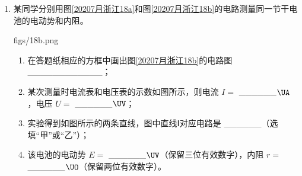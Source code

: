 \documentclass[\gkver]{gaokaozhenti}
\begin{document}
\begin{enumerate}
{（4）单摆的周期 $T=2\pi\sqrt{\frac{l}{g}}$，即 $T^{2}=\frac{4\pi^{2}}{g}\cdot l$。但是实验所得 $T^{2}-l$ 没过原点，测得重力加速度与当地结果相符，则斜率仍为 $\frac{4\pi^{2}}{g}$；则 $T^{2}=\frac{4\pi^{2}}{g}\cdot(l+l_{0})$，故实验可能是测量时直接将摆线的长度作为摆长了。
}

\item
某同学分别用图\ref{20207月浙江18a}和图\ref{20207月浙江18b}的电路测量同一节干电池的电动势和内阻。

{figs/18b.png}

\begin{enumerate}
	\item
	在答题纸相应的方框中画出图\ref{20207月浙江18b}的电路图 \_\_\_\_\_\_\_\_\_\_\_\_；

	\item
	某次测量时电流表和电压表的示数如图所示，则电流 $I=$ \_\_\_\_\_\_$\UA$，电压 $U=$ \_\_\_\_\_\_$\UV$；


	\item
	实验得到如图所示的两条直线，图中直线Ⅰ对应电路是 \_\_\_\_\_\_（选填“甲”或“乙”）；


	\item
	该电池的电动势 $E=$ \_\_\_\_\_\_$\UV$（保留三位有效数字），内阻 $r=$ \_\_\_\_\_\_$\UO$（保留两位有效数字）。
\end{enumerate}
\end{enumerate}
\end{document}
